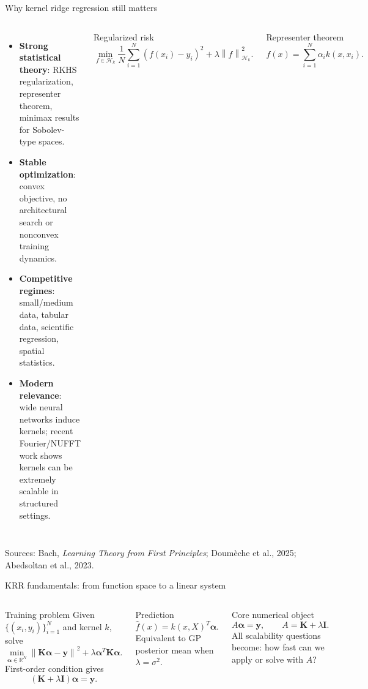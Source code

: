 \documentclass[aspectratio=169,11pt]{ctexbeamer}
\newcommand{\R}{\mathbb{R}}
\newcommand{\K}{\mathbf{K}}
\newcommand{\I}{\mathbf{I}}
\newcommand{\y}{\mathbf{y}}
\newcommand{\alphaVec}{\bm{\alpha}}
\newcommand{\norm}[1]{\left\lVert #1 \right\rVert}
\begin{document}
\begin{frame}{Why kernel ridge regression still matters}
\begin{columns}[T,onlytextwidth]
\begin{itemize}
  \item \textbf{Strong statistical theory}: RKHS regularization, representer theorem, minimax results for Sobolev-type spaces.
  \item \textbf{Stable optimization}: convex objective, no architectural search or nonconvex training dynamics.
  \item \textbf{Competitive regimes}: small/medium data, tabular data, scientific regression, spatial statistics.
  \item \textbf{Modern relevance}: wide neural networks induce kernels; recent Fourier/NUFFT work shows kernels can be extremely scalable in structured settings.
\end{itemize}
\begin{block}{Regularized risk}
\[
\min_{f\in\mathcal{H}_k}
\frac{1}{N}\sum_{i=1}^{N}(f(x_i)-y_i)^2 + \lambda \norm{f}_{\mathcal{H}_k}^2.
\]
\end{block}
\begin{block}{Representer theorem}
\[
 f(x)=\sum_{i=1}^{N}\alpha_i k(x,x_i).
\]
\end{block}
\end{columns}
\vspace{0.1cm}
\tiny Sources: Bach, \emph{Learning Theory from First Principles}; Doum\`eche et al., 2025; Abedsoltan et al., 2023.
\end{frame}

\begin{frame}{KRR fundamentals: from function space to a linear system}
\begin{columns}[T,onlytextwidth]
\begin{block}{Training problem}
Given $\{(x_i,y_i)\}_{i=1}^{N}$ and kernel $k$, solve
\[
\min_{\alphaVec\in\R^N}
\norm{\K \alphaVec-\y}^2 + \lambda\alphaVec^T\K\alphaVec.
\]
First-order condition gives
\[
(\K+\lambda\I)\alphaVec=\y.
\]
\end{block}
\begin{block}{Prediction}
\[
\widehat f(x)=k(x,X)^T\alphaVec.
\]
Equivalent to GP posterior mean when $\lambda=\sigma^2$.
\end{block}
\begin{block}{Core numerical object}
\[
A\alphaVec = \y,\qquad A=\K+\lambda\I.
\]
All scalability questions become: how fast can we apply or solve with $A$?
\end{block}
\end{columns}
\end{frame}
\end{document}
